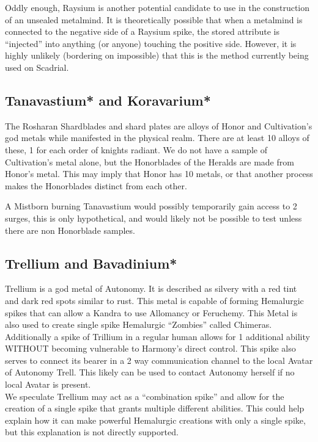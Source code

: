 \documentclass[conference]{IEEEtran}
\newcommand{\n}{\hfill\break}
\begin{document}
Oddly enough, Raysium is another potential candidate to use in the construction of an unsealed metalmind.  It is theoretically possible that when a metalmind is connected to the negative side of a Raysium spike, the stored attribute is ``injected'' into anything (or anyone) touching the positive side.  However, it is highly unlikely (bordering on impossible) that this is the method currently being used on Scadrial.  
\subsection*{\textbf{Tanavastium}*\cite{honor-name} \textbf{and} \textbf{Koravarium}*\cite{cultiv-name}}
The Rosharan Shardblades and shard plates are alloys of Honor and Cultivation's god metals while manifested in the physical realm.  There are at least 10 alloys of these, 1 for each order of knights radiant.\cite{shard-alloy}  We do not have a sample of Cultivation's metal alone, but the Honorblades of the Heralds are made from Honor's metal.\cite{honorblade}  This may imply that Honor has 10 metals, or that another process makes the Honorblades distinct from each other.

A Mistborn burning Tanavastium would possibly temporarily gain access to 2 surges, this is only hypothetical, and would likely not be possible to test unless there are non Honorblade samples.
\n
\subsection*{\textbf{Trellium}\cite{trellium} \textbf{and Bavadinium}*}
Trellium is a god metal of Autonomy.\cite{TLM-CH18}  It is described as silvery with a red tint and dark red spots similar to rust.\cite{SoS-EP}  This metal is capable of forming Hemalurgic spikes that can allow a Kandra to use Allomancy or Feruchemy.\cite{SoS-CH7}  This Metal is also used to create single spike Hemalurgic ``Zombies'' called Chimeras.\cite{SoS-CH21}  Additionally a spike of Trillium in a regular human allows for 1 additional ability WITHOUT becoming vulnerable to Harmony's direct control.\cite{TLM-CH4}\cite{TLM-CH65}  This spike also serves to connect its bearer in a 2 way communication channel to the local Avatar of Autonomy Trell.\cite{TLM-CH19} This likely can be used to contact Autonomy herself if no local Avatar is present.\\

We speculate Trellium may act as a ``combination spike'' and allow for the creation of a single spike that grants multiple different abilities.  This could help explain how it can make powerful Hemalurgic creations with only a single spike, but this explanation is not directly supported.\\
 
\end{document}
